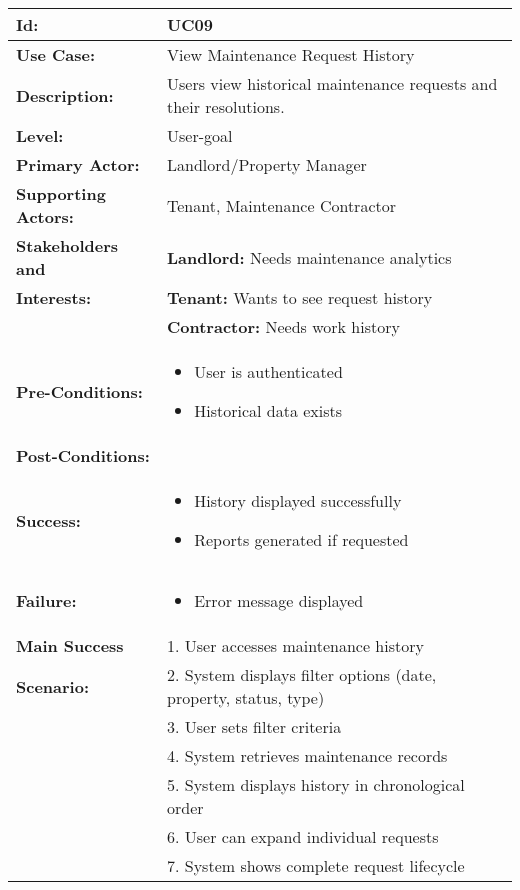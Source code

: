 \documentclass[12pt]{article}
\begin{document}
\begin{tabular}{|p{3cm}|p{11cm}|}
\hline
\textbf{Id:} & UC09 \\
\hline
\textbf{Use Case:} & View Maintenance Request History \\
\hline
\textbf{Description:} & Users view historical maintenance requests and their resolutions. \\
\hline
\textbf{Level:} & User-goal \\
\hline
\textbf{Primary Actor:} & Landlord/Property Manager \\
\hline
\textbf{Supporting Actors:} & Tenant, Maintenance Contractor \\
\hline
\textbf{Stakeholders and} & \textbf{Landlord:} Needs maintenance analytics \\
\textbf{Interests:} & \textbf{Tenant:} Wants to see request history \\
& \textbf{Contractor:} Needs work history \\
\hline
\textbf{Pre-Conditions:} & 
\begin{itemize}
    \item User is authenticated
    \item Historical data exists
\end{itemize} \\
\hline
\textbf{Post-Conditions:} & \\
\textbf{Success:} & 
\begin{itemize}
    \item History displayed successfully
    \item Reports generated if requested
\end{itemize} \\
\textbf{Failure:} & 
\begin{itemize}
    \item Error message displayed
\end{itemize} \\
\hline
\textbf{Main Success} & 1. User accesses maintenance history \\
\textbf{Scenario:} & 2. System displays filter options (date, property, status, type) \\
& 3. User sets filter criteria \\
& 4. System retrieves maintenance records \\
& 5. System displays history in chronological order \\
& 6. User can expand individual requests \\
& 7. System shows complete request lifecycle \\

\end{tabular}
\end{document}

